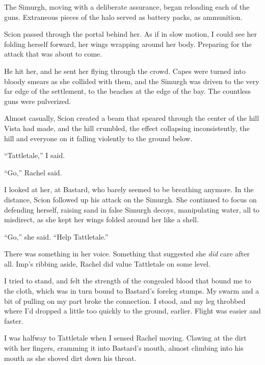 The Simurgh, moving with a deliberate assurance, began reloading each of the guns.  Extraneous pieces of the halo served as battery packs, as ammunition.



Scion passed through the portal behind her.  As if in slow motion, I could see her folding herself forward, her wings wrapping around her body.  Preparing for the attack that was about to come.



He hit her, and he sent her flying through the crowd.  Capes were turned into bloody smears as she collided with them, and the Simurgh was driven to the very far edge of the settlement, to the beaches at the edge of the bay.  The countless guns were pulverized.



Almost casually, Scion created a beam that speared through the center of the hill Vista had made, and the hill crumbled, the effect collapsing inconsistently, the hill and everyone on it falling violently to the ground below.



``Tattletale,'' I said.



``Go,'' Rachel said.



I looked at her, at Bastard, who barely seemed to be breathing anymore.  In the distance, Scion followed up his attack on the Simurgh.  She continued to focus on defending herself, raising sand in false Simurgh decoys, manipulating water, all to misdirect, as she kept her wings folded around her like a shell.



``Go,'' she said.  ``Help Tattletale.''



There was something in her voice.  Something that suggested she \emph{did} care after all.  Imp's ribbing aside, Rachel did value Tattletale on some level.



I tried to stand, and felt the strength of the congealed blood that bound me to the cloth, which was in turn bound to Bastard's foreleg stumps.  My swarm and a bit of pulling on my part broke the connection.  I stood, and my leg throbbed where I'd dropped a little too quickly to the ground, earlier.  Flight was easier and faster.



I was halfway to Tattletale when I sensed Rachel moving.  Clawing at the dirt with her fingers, cramming it into Bastard's mouth, almost climbing into his mouth as she shoved dirt down his throat.



